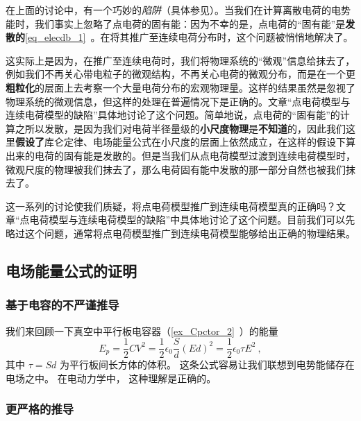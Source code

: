 在上面的讨论中，有一个巧妙的\textsl{陷阱}（具体参见\cite{GriffE}）。当我们在计算离散电荷的电势能时，我们事实上忽略了点电荷的固有能：因为不幸的是，点电荷的“固有能”是\textbf{发散的}\autoref{eq_elecdb_1}~。在将其推广至连续电荷分布时，这个问题被悄悄地解决了。

这实际上是因为，在推广至连续电荷时，我们将物理系统的“微观”信息给抹去了，例如我们不再关心带电粒子的微观结构，不再关心电荷的微观分布，而是在一个更\textbf{粗粒化}的层面上去考察一个大量电荷分布的宏观物理量。这样的结果虽然是忽视了物理系统的微观信息，但这样的处理在普遍情况下是正确的。文章“点电荷模型与连续电荷模型的缺陷”具体地讨论了这个问题。简单地说，点电荷的“固有能”的计算之所以发散，是因为我们对电荷半径量级的\textbf{小尺度物理}是\textbf{不知道}的，因此我们这里\textbf{假设了}库仑定律、电场能量公式在小尺度的层面上依然成立，在这样的假设下算出来的电荷的固有能是发散的。但是当我们从点电荷模型过渡到连续电荷模型时，微观尺度的物理被我们抹去了，那么电荷固有能中发散的那一部分自然也被我们抹去了。

这一系列的讨论使我们质疑，将点电荷模型推广到连续电荷模型真的正确吗？文章“点电荷模型与连续电荷模型的缺陷”中具体地讨论了这个问题。目前我们可以先略过这个问题，通常将点电荷模型推广到连续电荷模型能够给出正确的物理结果。

\subsection{电场能量公式的证明}

\subsubsection{基于电容的不严谨推导}
我们来回顾一下真空中平行板电容器（\autoref{ex_Cpctor_2}~）的能量
\begin{equation}
E_p = \frac12 CV^2 = \frac12 \epsilon_0 \frac Sd (Ed)^2 = \frac 12 \epsilon_0 \tau E^2~,
\end{equation}
其中 $\tau = Sd$ 为平行板间长方体的体积。 这条公式容易让我们联想到电势能储存在电场之中。 在电动力学中， 这种理解是正确的。

\subsubsection{更严格的推导}

